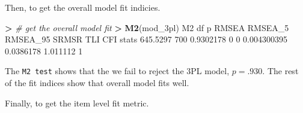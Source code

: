 \documentclass[
]{article}
\newenvironment{Shaded}{\begin{snugshade}}{\end{snugshade}}
\newcommand{\CommentTok}[1]{\textcolor[rgb]{0.56,0.35,0.01}{\textit{#1}}}
\newcommand{\ConstantTok}[1]{\textcolor[rgb]{0.56,0.35,0.01}{#1}}
\newcommand{\DecValTok}[1]{\textcolor[rgb]{0.00,0.00,0.81}{#1}}
\newcommand{\ErrorTok}[1]{\textcolor[rgb]{0.64,0.00,0.00}{\textbf{#1}}}
\newcommand{\FloatTok}[1]{\textcolor[rgb]{0.00,0.00,0.81}{#1}}
\newcommand{\FunctionTok}[1]{\textcolor[rgb]{0.13,0.29,0.53}{\textbf{#1}}}
\newcommand{\NormalTok}[1]{#1}
\newcommand{\SpecialCharTok}[1]{\textcolor[rgb]{0.81,0.36,0.00}{\textbf{#1}}}
\begin{document}
\begin{Shaded}
\end{Shaded}

Then, to get the overall model fit indicies.

\begin{Shaded}
\begin{Highlighting}[]
\SpecialCharTok{\textgreater{}} \CommentTok{\# get the overall model fit}
\ErrorTok{\textgreater{}} \FunctionTok{M2}\NormalTok{(mod\_3pl)}
\NormalTok{            M2  df         p RMSEA RMSEA\_5    RMSEA\_95     SRMSR      TLI CFI}
\NormalTok{stats }\FloatTok{645.5297} \DecValTok{700} \FloatTok{0.9302178}     \DecValTok{0}       \DecValTok{0} \FloatTok{0.004300395} \FloatTok{0.0386178} \FloatTok{1.011112}   \DecValTok{1}
\end{Highlighting}
\end{Shaded}

The \texttt{M2\ test} shows that the we fail to reject the 3PL model,
\(p = .930\). The rest of the fit indices show that overall model fits
well.

Finally, to get the item level fit metric.
\end{document}
